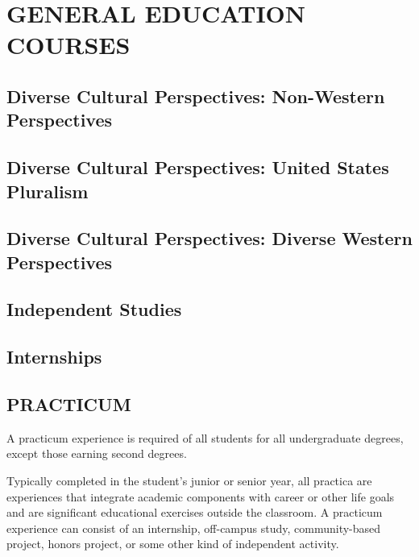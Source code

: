\documentclass[
  letterpaper,
]{scrbook}
\begin{document}
\hypertarget{general-education-courses}{%
\chapter{GENERAL EDUCATION COURSES}\label{general-education-courses}}

\hypertarget{diverse-cultural-perspectives-non-western-perspectives}{%
\section{Diverse Cultural Perspectives: Non-Western
Perspectives}\label{diverse-cultural-perspectives-non-western-perspectives}}

\hypertarget{diverse-cultural-perspectives-united-states-pluralism}{%
\section{Diverse Cultural Perspectives: United States
Pluralism}\label{diverse-cultural-perspectives-united-states-pluralism}}

\hypertarget{diverse-cultural-perspectives-diverse-western-perspectives}{%
\section{Diverse Cultural Perspectives: Diverse Western
Perspectives}\label{diverse-cultural-perspectives-diverse-western-perspectives}}

\hypertarget{independent-studies}{%
\section{Independent Studies}\label{independent-studies}}

\hypertarget{internships}{%
\section{Internships}\label{internships}}

\hypertarget{practicum}{%
\section{PRACTICUM}\label{practicum}}

A practicum experience is required of all students for all undergraduate
degrees, except those earning second degrees.

Typically completed in the student's junior or senior year, all practica
are experiences that integrate academic components with career or other
life goals and are significant educational exercises outside the
classroom. A practicum experience can consist of an internship,
off-campus study, community-based project, honors project, or some other
kind of independent activity.
\end{document}
